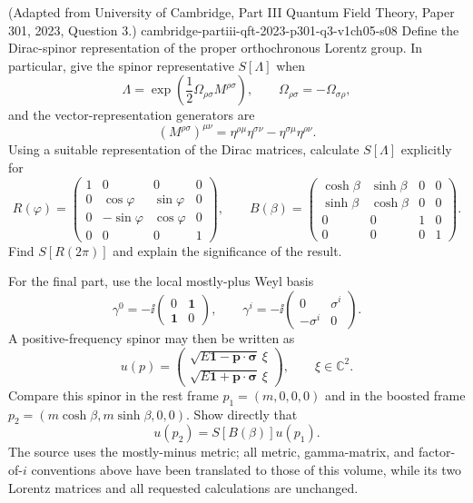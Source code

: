 \begin{enumerate}
  {(Adapted from University of Cambridge, Part III Quantum Field Theory, Paper 301, 2023, Question 3.)}
  {cambridge-partiii-qft-2023-p301-q3-v1ch05-s08}
Define the Dirac-spinor representation of the proper orthochronous Lorentz
group.  In particular, give the spinor representative \(S[\Lambda]\) when
\[
 \Lambda=\exp\!\left(\frac12\Omega_{\rho\sigma}M^{\rho\sigma}\right),
 \qquad \Omega_{\rho\sigma}=-\Omega_{\sigma\rho},
\]
and the vector-representation generators are
\[
 (M^{\rho\sigma})^{\mu\nu}
 =\eta^{\rho\mu}\eta^{\sigma\nu}
 -\eta^{\sigma\mu}\eta^{\rho\nu}.
\]
Using a suitable representation of the Dirac matrices, calculate
\(S[\Lambda]\) explicitly for
\[
 R(\varphi)=
 \begin{pmatrix}
 1&0&0&0\\
 0&\cos\varphi&\sin\varphi&0\\
 0&-\sin\varphi&\cos\varphi&0\\
 0&0&0&1
 \end{pmatrix},
 \qquad
 B(\beta)=
 \begin{pmatrix}
 \cosh\beta&\sinh\beta&0&0\\
 \sinh\beta&\cosh\beta&0&0\\
 0&0&1&0\\
 0&0&0&1
 \end{pmatrix}.
\]
Find \(S[R(2\pi)]\) and explain the significance of the result.

For the final part, use the local mostly-plus Weyl basis
\[
 \gamma^0=-\ii\begin{pmatrix}0&\mathbf1\\ \mathbf1&0\end{pmatrix},
 \qquad
 \gamma^i=-\ii\begin{pmatrix}0&\sigma^i\\-\sigma^i&0\end{pmatrix}.
\]
A positive-frequency spinor may then be written as
\[
 u(p)=
 \begin{pmatrix}
 \sqrt{E\mathbf1-\mathbf p\cdot\boldsymbol\sigma}\,\xi\\[2pt]
 \sqrt{E\mathbf1+\mathbf p\cdot\boldsymbol\sigma}\,\xi
 \end{pmatrix},
 \qquad \xi\in\mathbb C^2.
\]
Compare this spinor in the rest frame
\(p_1=(m,0,0,0)\) and in the boosted frame
\(p_2=(m\cosh\beta,m\sinh\beta,0,0)\).  Show directly that
\[
 u(p_2)=S[B(\beta)]u(p_1).
\]
The source uses the mostly-minus metric; all metric, gamma-matrix, and
factor-of-\(i\) conventions above have been translated to those of this
volume, while its two Lorentz matrices and all requested calculations are
unchanged.


\end{enumerate}
